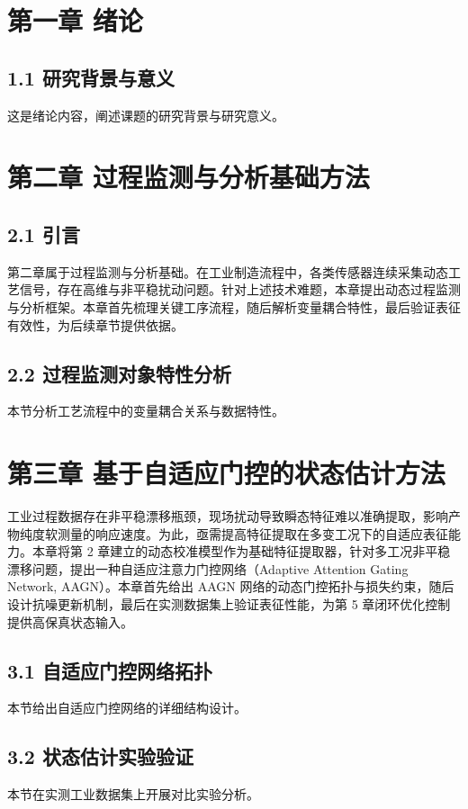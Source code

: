 \documentclass{ctexbook}
\begin{document}
\chapter{第一章 绪论}
\section{1.1 研究背景与意义}
这是绪论内容，阐述课题的研究背景与研究意义。

\chapter{第二章 过程监测与分析基础方法}
\section{2.1 引言}
第二章属于过程监测与分析基础。在工业制造流程中，各类传感器连续采集动态工艺信号，存在高维与非平稳扰动问题。针对上述技术难题，本章提出动态过程监测与分析框架。本章首先梳理关键工序流程，随后解析变量耦合特性，最后验证表征有效性，为后续章节提供依据。

\section{2.2 过程监测对象特性分析}
本节分析工艺流程中的变量耦合关系与数据特性。

\chapter{第三章 基于自适应门控的状态估计方法}
工业过程数据存在非平稳漂移瓶颈，现场扰动导致瞬态特征难以准确提取，影响产物纯度软测量的响应速度。为此，亟需提高特征提取在多变工况下的自适应表征能力。本章将第 2 章建立的动态校准模型作为基础特征提取器，针对多工况非平稳漂移问题，提出一种自适应注意力门控网络（Adaptive Attention Gating Network, AAGN）。本章首先给出 AAGN 网络的动态门控拓扑与损失约束，随后设计抗噪更新机制，最后在实测数据集上验证表征性能，为第 5 章闭环优化控制提供高保真状态输入。

\section{3.1 自适应门控网络拓扑}
本节给出自适应门控网络的详细结构设计。

\section{3.2 状态估计实验验证}
本节在实测工业数据集上开展对比实验分析。
\end{document}
